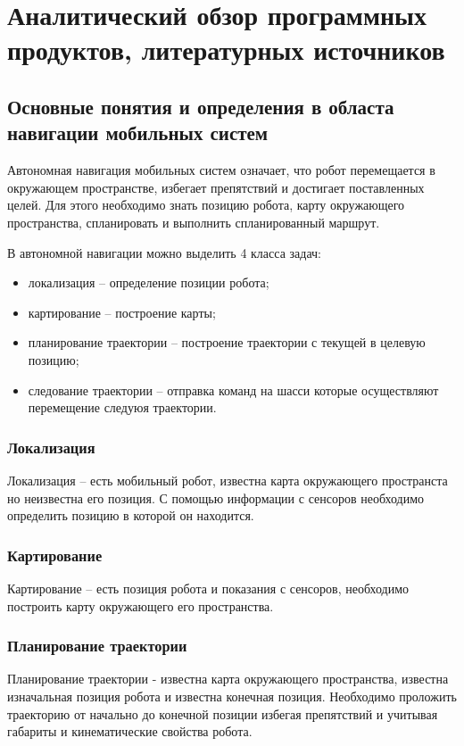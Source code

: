 \section{Аналитический обзор программных продуктов, литературных источников}

\subsection{Основные понятия и определения в областа навигации мобильных систем } 

Автономная навигация мобильных систем означает, что робот перемещается в
окружающем пространстве, избегает препятствий и достигает поставленных целей.
Для этого необходимо знать позицию робота, карту окружающего пространства,
спланировать и выполнить спланированный маршрут.

В автономной навигации можно выделить 4 класса задач:
\begin{itemize}
	\item локализация -- определение позиции робота;
	\item картирование -- построение карты;
	\item планирование траектории -- построение траектории с текущей в целевую
		позицию;
	\item следование траектории -- отправка команд на шасси которые
		осуществляют перемещение следуюя траектории.
\end{itemize}

\subsubsection{Локализация}
Локализация -- есть мобильный робот, известна карта окружающего пространста но
неизвестна его позиция. С помощью информации с сенсоров необходимо определить
позицию в которой он находится.

\subsubsection{Картирование}
Картирование -- есть позиция робота и показания с сенсоров, необходимо
построить карту окружающего его пространства.

\subsubsection{Планирование траектории}
Планирование траектории - известна карта окружающего пространства, известна
изначальная позиция робота и известна конечная позиция. Необходимо проложить
траекторию от начально до конечной позиции избегая препятствий и учитывая
габариты и кинематические свойства робота.

